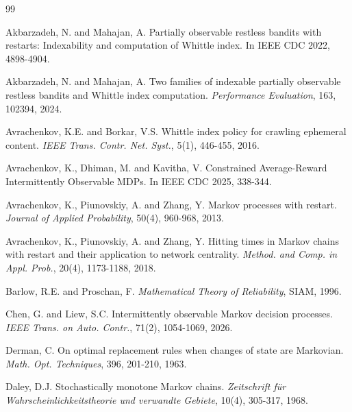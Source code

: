 \documentclass[letterpaper,10pt,conference]{ieeeconf}  %
\begin{document}
%


\begin{thebibliography}{99}

 Akbarzadeh, N. and Mahajan, A. Partially observable restless bandits with restarts: Indexability and computation of Whittle index. In IEEE CDC 2022, 4898-4904.

 Akbarzadeh, N. and Mahajan, A. Two families of indexable partially observable restless bandits and Whittle index computation. {\it Performance Evaluation}, 163, 102394, 2024.

 Avrachenkov, K.E. and Borkar, V.S. Whittle index policy for crawling ephemeral content. {\it IEEE Trans. Contr. Net. Syst.}, 5(1), 446-455, 2016.

 Avrachenkov, K., Dhiman, M. and Kavitha, V. Constrained Average-Reward Intermittently Observable MDPs. In IEEE CDC 2025, 338-344. 

 Avrachenkov, K., Piunovskiy, A. and Zhang, Y. Markov processes with restart. {\it Journal of Applied Probability}, 50(4), 960-968, 2013.

 Avrachenkov, K., Piunovskiy, A. and Zhang, Y. Hitting times in Markov chains with restart and their application to network centrality. {\it Method. and Comp. in Appl. Prob.}, 20(4), 1173-1188, 2018.

 Barlow, R.E. and Proschan, F. {\it Mathematical Theory of Reliability}, SIAM, 1996.

 Chen, G. and Liew, S.C. Intermittently observable Markov decision processes. {\it IEEE Trans. on Auto. Contr.}, 71(2), 1054-1069, 2026. 

 Derman, C. On optimal replacement rules when changes of state are Markovian. {\it Math. Opt. Techniques}, 396, 201-210, 1963.

 Daley, D.J. 
Stochastically monotone Markov chains. 
{\it Zeitschrift für Wahrscheinlichkeitstheorie und verwandte Gebiete}, 10(4), 305-317, 1968.


\end{thebibliography}
\end{document}

